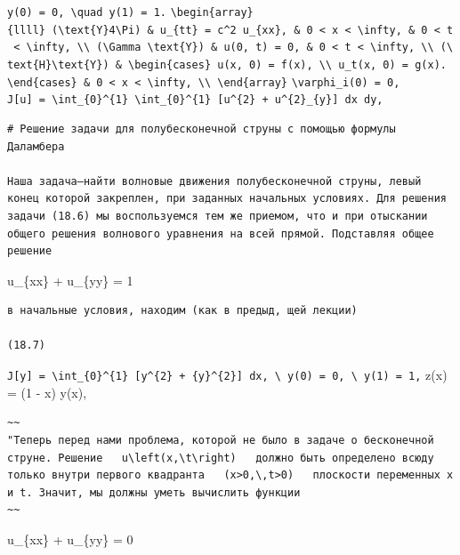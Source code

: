 \documentclass[
  ukrainian,
]{article}
\begin{document}
\texttt{y(0)\ =\ 0,\ \textbackslash{}quad\ y(1)\ =\ 1.}
\texttt{\textbackslash{}begin\{array\}\{llll\}\ (\textbackslash{}text\{Y\}4\textbackslash{}Pi)\ \&\ u\_\{tt\}\ =\ c\^{}2\ u\_\{xx\},\ \&\ 0\ \textless{}\ x\ \textless{}\ \textbackslash{}infty,\ \&\ 0\ \textless{}\ t\ \textless{}\ \textbackslash{}infty,\ \textbackslash{}\textbackslash{}\ (\textbackslash{}Gamma\ \textbackslash{}text\{Y\})\ \&\ u(0,\ t)\ =\ 0,\ \&\ 0\ \textless{}\ t\ \textless{}\ \textbackslash{}infty,\ \textbackslash{}\textbackslash{}\ (\textbackslash{}text\{H\}\textbackslash{}text\{Y\})\ \&\ \textbackslash{}begin\{cases\}\ u(x,\ 0)\ =\ f(x),\ \textbackslash{}\textbackslash{}\ u\_t(x,\ 0)\ =\ g(x).\ \textbackslash{}end\{cases\}\ \&\ 0\ \textless{}\ x\ \textless{}\ \textbackslash{}infty,\ \textbackslash{}\textbackslash{}\ \textbackslash{}end\{array\}}
\texttt{\textbackslash{}varphi\_i(0)\ =\ 0,}
\texttt{J{[}u{]}\ =\ \textbackslash{}int\_\{0\}\^{}\{1\}\ \textbackslash{}int\_\{0\}\^{}\{1\}\ {[}u\^{}\{2\}\ +\ u\^{}\{2\}\_\{y\}{]}\ dx\ dy,}

\begin{verbatim}
# Решение задачи для полубесконечной струны с помощью формулы Даламбера

Наша задача—найти волновые движения полубесконечной струны, левый конец которой закреплен, при заданных начальных условиях. Для решения задачи (18.6) мы воспользуемся тем же приемом, что и при отыскании общего решения волнового уравнения на всей прямой. Подставляя общее решение
\end{verbatim}

u\_\{xx\} + u\_\{yy\} = 1

\begin{verbatim}
в начальные условия, находим (как в предыд, щей лекции)

(18.7)
\end{verbatim}

\texttt{J{[}y{]}\ =\ \textbackslash{}int\_\{0\}\^{}\{1\}\ {[}y\^{}\{2\}\ +\ \{y\textquotesingle{}\}\^{}\{2\}{]}\ dx,\ \textbackslash{}\ y(0)\ =\ 0,\ \textbackslash{}\ y(1)\ =\ 1,}
z(x) = (1 - x) y(x),

\begin{verbatim}
~~
"Теперь перед нами проблема, которой не было в задаче о бесконечной струне. Решение   u\left(x,\t\right)   должно быть определено всюду только внутри первого квадранта   (x>0,\,t>0)   плоскости переменных x и t. Значит, мы должны уметь вычислить функции
~~
\end{verbatim}

u\_\{xx\} + u\_\{yy\} = 0
\end{document}
